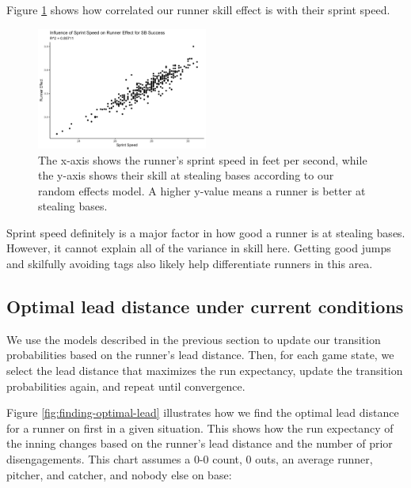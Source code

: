 \documentclass{article}
\begin{document}
        Figure \ref{fig:random-effect-runner} shows how correlated our runner skill effect is with their sprint speed.

         \begin{figure}
          \label{fig:random-effect-runner}
          \centering
          \includegraphics[width = 0.5\textwidth]{figures/runner_effect.png}
          \caption{The x-axis shows the runner's sprint speed in feet per second, while the y-axis shows their skill at stealing bases according to our random effects model. A higher y-value means a runner is better at stealing bases.}
        \end{figure}

        Sprint speed definitely is a major factor in how good a runner is at stealing bases. However, it cannot explain all of the variance in skill here. Getting good jumps and skilfully avoiding tags also likely help differentiate runners in this area.

    

    \subsection{Optimal lead distance under current conditions}
    
      We use the models described in the previous section to update our transition probabilities based on the runner's lead distance. Then, for each game state, we select the lead distance that maximizes the run expectancy, update the transition probabilities again, and repeat until convergence. 
    

        Figure \ref{fig:finding-optimal-lead} illustrates how we find the optimal lead distance for a runner on first in a given situation. This shows how the run expectancy of the inning changes based on the runner's lead distance and the number of prior disengagements. This chart assumes a 0-0 count, 0 outs, an average runner, pitcher, and catcher, and nobody else on base:
\end{document}
